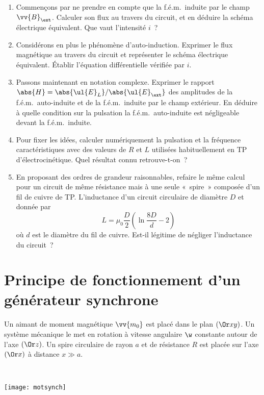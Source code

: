 \documentclass[a4paper, 10pt, final, garamond]{book}
\begin{document}
\begin{enumerate}
  \item Commençons par ne prendre en compte que la f.é.m.\ induite par le champ
    $\vv{B}_{\ext}$. Calculer son flux au travers du circuit, et en déduire la
    schéma électrique équivalent. Que vaut l'intensité $i$~?
  \item Considérons en plus le phénomène d'auto-induction. Exprimer le flux
    magnétique au travers du circuit et représenter le schéma électrique
    équivalent. Établir l'équation différentielle vérifiée par $i$.
  \item Passons maintenant en notation complexe. Exprimer le rapport $\abs{H} =
    \abs{\ul{E}_L}/\abs{\ul{E}_{\ext}}$ des amplitudes de la f.é.m.\
    auto-induite et de la f.é.m.\ induite par le champ extérieur. En déduire à
    quelle condition sur la pulsation la f.é.m.\ auto-induite est négligeable
    devant la f.é.m.\ induite.
  \item Pour fixer les idées, calculer numériquement la pulsation et la
    fréquence caractéristiques avec des valeurs de $R$ et $L$ utilisées
    habituellement en TP d'électrocinétique. Quel résultat connu retrouve-t-on~?
  \item En proposant des ordres de grandeur raisonnables, refaire le même calcul
    pour un circuit de même résistance mais à une seule «~spire~» composée d'un
    fil de cuivre de TP. L'inductance d'un circuit circulaire de diamètre $D$ et
    donnée par
    \[
      L = \mu_0 \frac{D}{2} \left( \ln \frac{8D}{d} - 2 \right)
    \]
    où $d$ est le diamètre du fil de cuivre. Est-il légitime de négliger
    l'inductance du circuit~?
\end{enumerate}

\section{Principe de fonctionnement d'un générateur synchrone}
\label{sec:motsynch}
\noindent
\begin{minipage}[t]{.6\linewidth}
  Un aimant de moment magnétique $\vv{m_0}$ est placé dans le plan $(\Or xy)$. Un
  système mécanique le met en rotation à vitesse angulaire $\w$ constante autour
  de l'axe $(\Or z)$. Un spire circulaire de rayon $a$ et de résistance $R$ est
  placée sur l'axe $(\Or x)$ à distance $x \gg a$.
\end{minipage}
\hfill
\begin{minipage}[t]{.39\linewidth}
  ~
  \vspace{-20pt}
  \begin{center}
    \texttt{[image: motsynch]}
    \label{fig:motsynch}
  \end{center}
\end{minipage}
\end{document}
